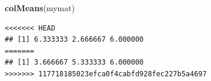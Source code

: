 \documentclass[]{book}
\newenvironment{Shaded}{\begin{snugshade}}{\end{snugshade}}
\newcommand{\KeywordTok}[1]{\textcolor[rgb]{0.13,0.29,0.53}{\textbf{#1}}}
\newcommand{\NormalTok}[1]{#1}
\begin{document}
\begin{Shaded}
\begin{Highlighting}[]
\KeywordTok{colMeans}\NormalTok{(mymat)}
\end{Highlighting}
\end{Shaded}

\begin{verbatim}
<<<<<<< HEAD
## [1] 6.333333 2.666667 6.000000
=======
## [1] 3.666667 5.333333 6.000000
>>>>>>> 117718185023efca0f4cabfd928fec227b5a4697
\end{verbatim}


\end{document}
